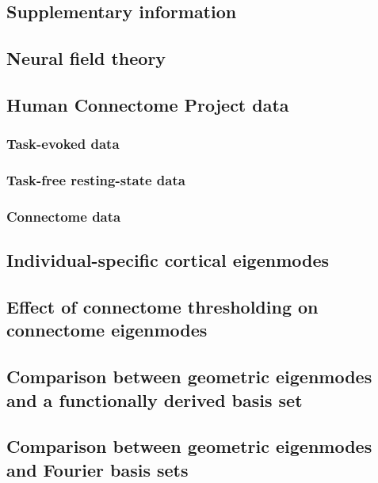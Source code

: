\documentclass[sn-mathphys-num]{sn-jnl}%
\theoremstyle{thmstyleone}%
\theoremstyle{thmstyletwo}%
\theoremstyle{thmstylethree}%
\begin{document}
\begin{appendices}
	
	
\section{Supplementary information} \label{secInfo}

\subsection{Neural field theory} \label{sec:NFT} 

\subsection{Human Connectome Project data} \label{sec:sup_2}

\subsubsection{Task-evoked data} \label{sec:sup_2_1}

\subsubsection{Task-free resting-state data} \label{sec:sup_2_2}

\subsubsection{Connectome data} \label{sec:sup_2_3}


\subsection{Individual-specific cortical eigenmodes} \label{sec:individual_specific}

\subsection{Effect of connectome thresholding on connectome eigenmodes} \label{sec:thresholding_effect}

\subsection{Comparison between geometric eigenmodes and a functionally derived basis set} \label{sec:comparison_eigenmodes_derived}

\subsection{Comparison between geometric eigenmodes and Fourier basis sets} \label{sec:comparison_fourier}


\end{appendices}
\end{document}
